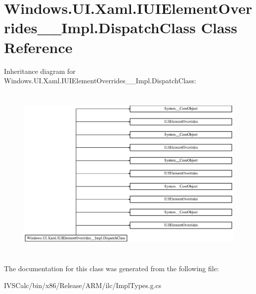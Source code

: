 \hypertarget{class_windows_1_1_u_i_1_1_xaml_1_1_i_u_i_element_overrides_____impl_1_1_dispatch_class}{}\section{Windows.\+U\+I.\+Xaml.\+I\+U\+I\+Element\+Overrides\+\_\+\+\_\+\+Impl.\+Dispatch\+Class Class Reference}
\label{class_windows_1_1_u_i_1_1_xaml_1_1_i_u_i_element_overrides_____impl_1_1_dispatch_class}
Inheritance diagram for Windows.\+U\+I.\+Xaml.\+I\+U\+I\+Element\+Overrides\+\_\+\+\_\+\+Impl.\+Dispatch\+Class\+:\begin{figure}[H]
\begin{center}
\leavevmode
\includegraphics[height=8.651686cm]{class_windows_1_1_u_i_1_1_xaml_1_1_i_u_i_element_overrides_____impl_1_1_dispatch_class}
\end{center}
\end{figure}


The documentation for this class was generated from the following file\+:\begin{DoxyCompactItemize}
\item 
I\+V\+S\+Calc/bin/x86/\+Release/\+A\+R\+M/ilc/Impl\+Types.\+g.\+cs\end{DoxyCompactItemize}
